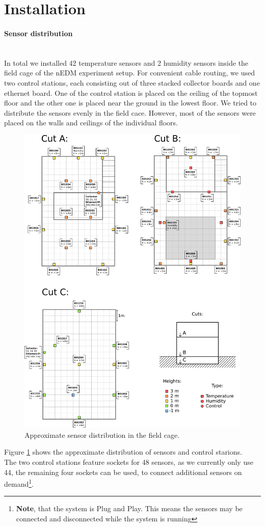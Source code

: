 \documentclass[a4paper]{scrreprt}
\begin{document}
\section{Installation}
\paragraph{Sensor distribution}\hspace{1cm}\\
In total we installed 42 temperature sensors and 2 humidity sensors inside the field
cage of the nEDM experiment setup. For convenient cable routing, we used
two control stations, each consisting out of three stacked collector boards and one
ethernet board. One of the control station is placed on the ceiling of the
topmost floor and the other one is placed near the ground in the lowest floor. We tried
to distribute the sensors evenly in the field cace. However, most
of the sensors were placed on the walls and ceilings of the individual floors. 
\begin{figure}
	\centering
	\includegraphics[width=\textwidth]{img/installPlan.pdf}
  \caption{Approximate sensor distribution in the field cage.}
	\label{fig:install}
\end{figure}
Figure
\ref{fig:install} shows the approximate distribution of sensors and control starions.\\
The two control stations feature sockets for 48 sensors, as we currently only use 44,
the remaining four sockets can be used, to connect additional sensors on demand\footnote{\textbf{Note}, that
the system is Plug and Play. This means the sensors may be connected and disconnected
while the system is running}.\\
\end{document}
